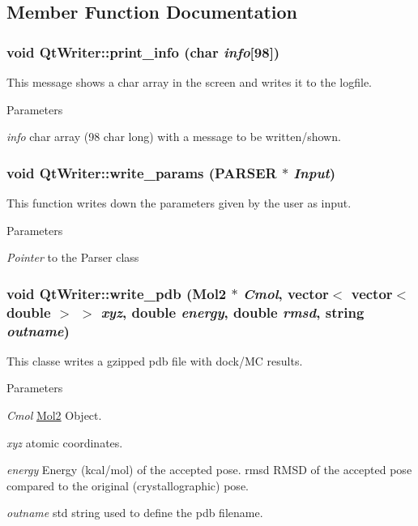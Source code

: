 \subsection{Member Function Documentation}
\hypertarget{classQtWriter_add3a6572744ffda956d733a0b64c7177}{
\subsubsection[{print\_\-info}]{\setlength{\rightskip}{0pt plus 5cm}void QtWriter::print\_\-info (char {\em info}\mbox{[}98\mbox{]})}}
\label{classQtWriter_add3a6572744ffda956d733a0b64c7177}
This message shows a char array in the screen and writes it to the logfile. 
\begin{DoxyParams}{Parameters}
\item[{\em info}]char array (98 char long) with a message to be written/shown. \end{DoxyParams}
\hypertarget{classQtWriter_aeaba3939272a4c6a5a103d493a1de7e4}{
\subsubsection[{write\_\-params}]{\setlength{\rightskip}{0pt plus 5cm}void QtWriter::write\_\-params ({\bf PARSER} $\ast$ {\em Input})}}
\label{classQtWriter_aeaba3939272a4c6a5a103d493a1de7e4}
This function writes down the parameters given by the user as input. 
\begin{DoxyParams}{Parameters}
\item[{\em Pointer}]to the Parser class \end{DoxyParams}
\hypertarget{classQtWriter_ab8c11ceff2dd119f9a6ebde4963daaf5}{
\subsubsection[{write\_\-pdb}]{\setlength{\rightskip}{0pt plus 5cm}void QtWriter::write\_\-pdb ({\bf Mol2} $\ast$ {\em Cmol}, \/  vector$<$ vector$<$ double $>$ $>$ {\em xyz}, \/  double {\em energy}, \/  double {\em rmsd}, \/  string {\em outname})}}
\label{classQtWriter_ab8c11ceff2dd119f9a6ebde4963daaf5}
This classe writes a gzipped pdb file with dock/MC results. 
\begin{DoxyParams}{Parameters}
\item[{\em Cmol}]\hyperlink{classMol2}{Mol2} Object. \item[{\em xyz}]atomic coordinates. \item[{\em energy}]Energy (kcal/mol) of the accepted pose.  rmsd RMSD of the accepted pose compared to the original (crystallographic) pose. \item[{\em outname}]std string used to define the pdb filename. \end{DoxyParams}
